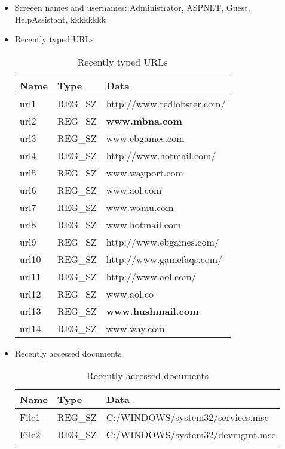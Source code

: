 \documentclass[5pt]{article}
\begin{document}
\begin{itemize}
\begin{table}[ht]
\begin{tabular}{|l|l|l|}
  \end{tabular}
  \label{tab:firefoxTab}
\end{table}

\newpage

\item Screeen names and usernames: Administrator, ASPNET, Guest, HelpAssistant,
kkkkkkkk
\item Recently typed URLs
\begin{table}[ht]
  \centering
  \caption{Recently typed URLs}
  \begin{tabular}{|l|l|l|}
  \hline
  Name & Type & Data\\
  \hline
  \hline
url1 & REG\_SZ & http://www.redlobster.com/\\
  \hline
url2 & REG\_SZ & \textbf{www.mbna.com}\\
  \hline
url3 & REG\_SZ & www.ebgames.com\\
  \hline
url4 & REG\_SZ & http://www.hotmail.com/\\
  \hline
url5 & REG\_SZ & www.wayport.com\\
  \hline
url6 & REG\_SZ & www.aol.com\\
  \hline
url7 & REG\_SZ & www.wamu.com\\
  \hline
url8 & REG\_SZ & www.hotmail.com\\
  \hline
url9 & REG\_SZ & http://www.ebgames.com/\\
  \hline
url10 & REG\_SZ & http://www.gamefaqs.com/\\
  \hline
url11 & REG\_SZ & http://www.aol.com/\\
  \hline
url12 & REG\_SZ & www.aol.co\\
  \hline
url13 & REG\_SZ & \textbf{www.hushmail.com}\\
  \hline
url14 & REG\_SZ & www.way.com\\ 
\hline
  
  \end{tabular}
  \label{tab:urlsTab}
\end{table}



\item Recently accessed documents
\begin{table}[ht]
  \centering
  \caption{Recently accessed documents}
  \begin{tabular}{|l|l|l|}
  \hline
  Name & Type & Data\\
  \hline
  \hline
File1 &	REG\_SZ &	C:/WINDOWS/system32/services.msc\\
\hline
File2 &	REG\_SZ &	C:/WINDOWS/system32/devmgmt.msc\\
  \hline
  
  \end{tabular}
  \label{tab:docsTab}
\end{table}
\end{itemize}
\end{document}
